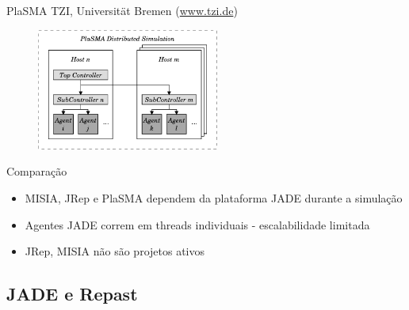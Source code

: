 \begin{frame}{PlaSMA}
	TZI, Universität Bremen (\url{www.tzi.de})

	\begin{figure}
		\centering
		\includegraphics[height=4cm]{figures/PlaSMA.pdf}
	\end{figure}
\end{frame}

\begin{frame}{Comparação}
	\begin{itemize}
		\item MISIA, JRep e PlaSMA dependem da plataforma JADE durante a simulação
		\item Agentes JADE correm em threads individuais - escalabilidade limitada
		\item JRep, MISIA não são projetos ativos
	\end{itemize}
\end{frame}

\subsection{JADE e Repast}

